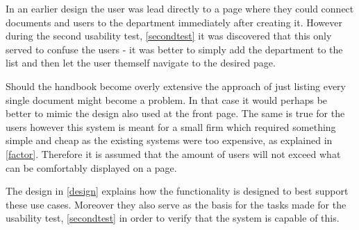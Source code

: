 


In an earlier design the user was lead directly to a page where they could connect documents and users to the department immediately after creating it.
However during the second usability test, \cref{secondtest} it was discovered that this only served to confuse the users - it was better to simply add the department to the list and then let the user themself navigate to the desired page.

Should the handbook become overly extensive the approach of just listing every single document might become a problem. In that case it would perhaps be better to mimic the design also used at the front page. The same is true for the users however this system is meant for a small firm which required something simple and cheap as the existing systems were too expensive, as explained in \cref{factor}. Therefore it is assumed that the amount of users will not exceed what can be comfortably displayed on a page.

The design in \cref{design} explains how the functionality is designed to best support these use cases. Moreover they also serve as the basis for the tasks made for the usability test, \cref{secondtest} in order to verify that the system is capable of this.
